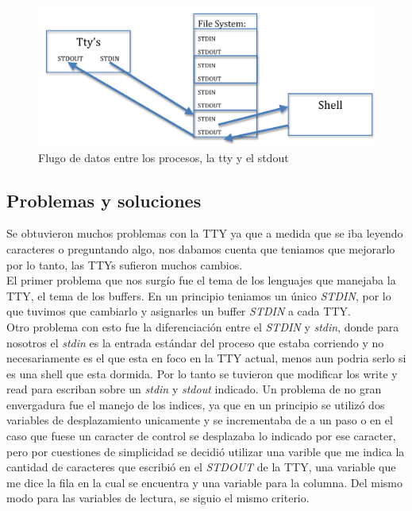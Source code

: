 \documentclass[10pt,a4paper]{article}
\begin{document}
	\begin{figure}
	\begin{center} 
	\includegraphics[angle=0, width=1\textwidth , height=0.3\textheight]{flujoTTY2.png} 
	\caption{Flugo de datos entre los procesos, la tty y el stdout}
	\end{center} 
	\end{figure}

	\subsection{Problemas y soluciones}
		Se obtuvieron muchos problemas con la TTY ya que a medida que se iba leyendo caracteres o preguntando algo, nos dabamos cuenta que teniamos que mejorarlo por lo tanto, las TTYs sufieron muchos cambios.\\
		El primer problema que nos surg\'io fue el tema de los lenguajes que manejaba la TTY, el tema de los buffers. En un principio teniamos un \'unico \textit{STDIN}, por lo que tuvimos que cambiarlo y asignarles un buffer \textit{STDIN} a cada TTY. \\
		Otro problema con esto fue la diferenciaci\'on entre el \textit{STDIN} y \textit{stdin}, donde para nosotros el \textit{stdin} es la entrada est\'andar del proceso que estaba corriendo y no necesariamente es el que esta en foco en la TTY actual, menos aun podria serlo si es una shell que esta dormida. Por lo tanto se tuvieron que modificar los write y read para escriban sobre un \textit{stdin} y \textit{stdout} indicado.
		Un problema de no gran envergadura fue el manejo de los indices, ya que en un principio se utiliz\'o dos variables de desplazamiento unicamente y se incrementaba de a un paso o en el caso que fuese un caracter de control se desplazaba lo indicado por ese caracter, pero por cuestiones de simplicidad se decidi\'o utilizar una varible que me indica la cantidad de caracteres que escribi\'o en el \textit{STDOUT} de la TTY, una variable que me dice la fila en la cual se encuentra y una variable para la columna. Del mismo modo para las variables de lectura, se siguio el mismo criterio.
\end{document}
